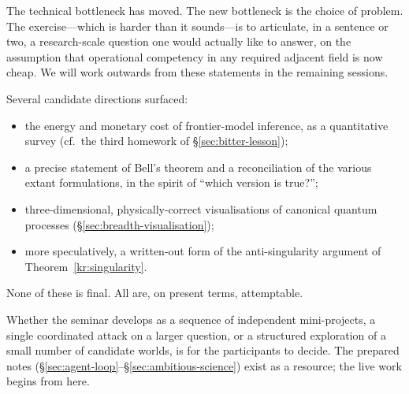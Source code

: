 \begin{keyresult}\label{kr:homework-world}
  The technical bottleneck has moved.  The new bottleneck is
  the choice of problem.  The exercise---which is harder
  than it sounds---is to articulate, in a sentence or two, a
  research-scale question one would actually like to answer,
  on the assumption that operational competency in any
  required adjacent field is now cheap.  We will work
  outwards from these statements in the remaining sessions.
\end{keyresult}

\begin{audience}
  Several candidate directions surfaced:
  \begin{itemize}
    \item the energy and monetary cost of frontier-model
      inference, as a quantitative survey
      (cf.\ the third homework of \S\ref{sec:bitter-lesson});
    \item a precise statement of Bell's theorem and a
      reconciliation of the various extant formulations,
      in the spirit of ``which version is true?'';
    \item three-dimensional, physically-correct
      visualisations of canonical quantum processes
      (\S\ref{sec:breadth-visualisation});
    \item more speculatively, a written-out form of the
      anti-singularity argument of
      Theorem~\ref{kr:singularity}.
  \end{itemize}
  None of these is final.  All are, on present terms,
  attemptable.
\end{audience}

\begin{remark}
  Whether the seminar develops as a sequence of independent
  mini-projects, a single coordinated attack on a larger
  question, or a structured exploration of a small number of
  candidate worlds, is for the participants to decide.  The
  prepared notes (\S\ref{sec:agent-loop}--\S\ref{sec:ambitious-science})
  exist as a resource; the live work begins from here.
\end{remark}
